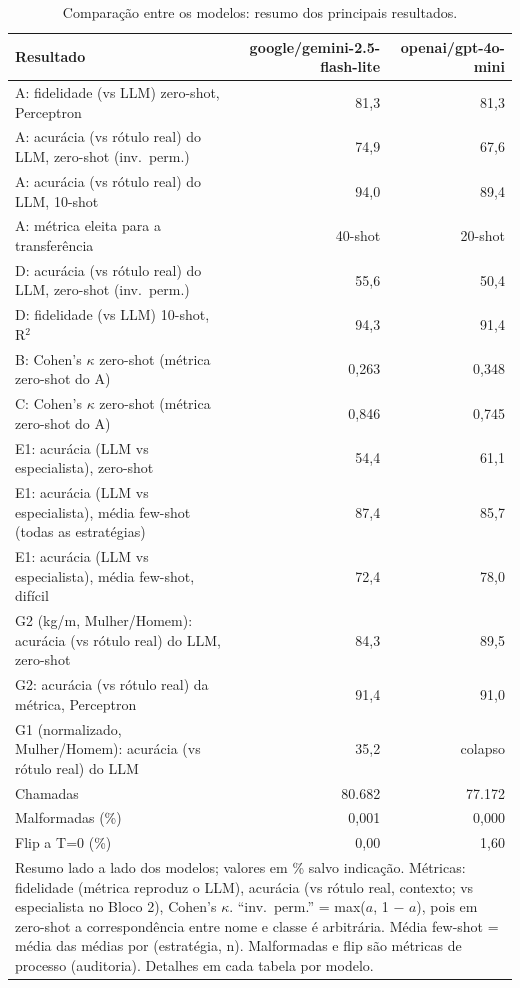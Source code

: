 \begin{table}[htbp]
\centering
\small
\caption{Comparação entre os modelos: resumo dos principais resultados.}
\label{tab:final_comparacao_modelos}
\begin{tabular}{lrr}
\toprule
Resultado & google/gemini-2.5-flash-lite & openai/gpt-4o-mini \\
\midrule
A: fidelidade (vs LLM) zero-shot, Perceptron & 81,3 & 81,3 \\
A: acurácia (vs rótulo real) do LLM, zero-shot (inv.\ perm.) & 74,9 & 67,6 \\
A: acurácia (vs rótulo real) do LLM, 10-shot & 94,0 & 89,4 \\
A: métrica eleita para a transferência & 40-shot & 20-shot \\
D: acurácia (vs rótulo real) do LLM, zero-shot (inv.\ perm.) & 55,6 & 50,4 \\
D: fidelidade (vs LLM) 10-shot, R$^2$ & 94,3 & 91,4 \\
B: Cohen's $\kappa$ zero-shot (métrica zero-shot do A) & 0,263 & 0,348 \\
C: Cohen's $\kappa$ zero-shot (métrica zero-shot do A) & 0,846 & 0,745 \\
E1: acurácia (LLM vs especialista), zero-shot & 54,4 & 61,1 \\
E1: acurácia (LLM vs especialista), média few-shot (todas as estratégias) & 87,4 & 85,7 \\
E1: acurácia (LLM vs especialista), média few-shot, difícil & 72,4 & 78,0 \\
G2 (kg/m, Mulher/Homem): acurácia (vs rótulo real) do LLM, zero-shot & 84,3 & 89,5 \\
G2: acurácia (vs rótulo real) da métrica, Perceptron & 91,4 & 91,0 \\
G1 (normalizado, Mulher/Homem): acurácia (vs rótulo real) do LLM & 35,2 & colapso \\
Chamadas & 80.682 & 77.172 \\
Malformadas (\%) & 0,001 & 0,000 \\
Flip a T=0 (\%) & 0,00 & 1,60 \\
\bottomrule
\multicolumn{3}{p{0.95\linewidth}}{\footnotesize Resumo lado a lado dos modelos; valores em \% salvo indicação. Métricas: fidelidade (métrica reproduz o LLM), acurácia (vs rótulo real, contexto; vs especialista no Bloco 2), Cohen's $\kappa$. ``inv.\ perm.'' = max($a$, 1 $-$ $a$), pois em zero-shot a correspondência entre nome e classe é arbitrária. Média few-shot = média das médias por (estratégia, n). Malformadas e flip são métricas de processo (auditoria). Detalhes em cada tabela por modelo.} \\
\end{tabular}
\end{table}
